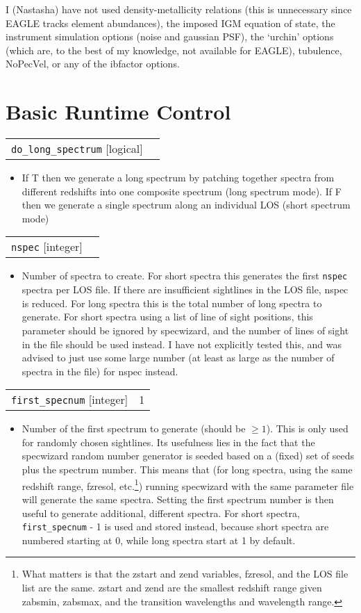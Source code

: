 \documentclass{report}
\makeatletter
\newcommand{\paramdefinition}[3]{
\begin{tabular*}{\textwidth}{l@{\extracolsep{\fill}}r}
		{\tt #1} [{\sc #2}]& #3 \\
\end{tabular*}}
\newcommand{\paramdescription}[1]{
\begin{itemize}
\item #1
\end{itemize}\vspace{0.2cm}}
\newcommand{\param}[1]{{\tt #1}}
\makeatother
\begin{document}
I (Nastasha) have not used density-metallicity relations (this is unnecessary since EAGLE tracks element abundances), the imposed IGM equation of state, the instrument simulation options (noise and gaussian PSF),  the `urchin' options (which are, to the best of my knowledge, not available for EAGLE), tubulence, NoPecVel, or any of the ibfactor options. 


\section{Basic Runtime Control}

\paramdefinition{do\_long\_spectrum}{logical}{}
\paramdescription{If T then we generate a long spectrum by patching together spectra from different redshifts into one composite spectrum (long spectrum mode).  If F then we generate a single spectrum along an individual LOS (short spectrum mode)}

\paramdefinition{nspec}{integer}{}
\paramdescription{Number of spectra to create.  For short spectra this generates the first {\tt nspec} spectra per LOS file. If there are insufficient sightlines in the LOS file, nspec is reduced. For long spectra this is the total number of long spectra to generate. For short spectra using a list of line of sight positions, this parameter should be ignored by specwizard, and the number of lines of sight in the file should be used instead. I have not explicitly tested this, and was advised to just use some large number (at least as large as the number of spectra in the file) for nspec instead.}

\paramdefinition{first\_specnum}{integer}{1}
\paramdescription{Number of the first spectrum to generate (should be $\geq 1$). This is only used for randomly chosen sightlines. Its usefulness lies in the fact that the specwizard random number generator is seeded based on a (fixed) set of seeds plus the spectrum number. This means that (for long spectra, using the same redshift range, fzresol, etc.\footnote{What matters is that the zstart and zend variables, fzresol, and the LOS file list are the same. zstart and zend are the smallest redshift range given zabsmin, zabsmax, and the transition wavelengths and wavelength range.}) running specwizard with the same parameter file will generate the same spectra. Setting the first spectrum number is then useful to generate additional, different spectra. For short spectra, \param{first\_specnum} - 1 is used and stored instead, because short spectra are numbered starting at 0, while long spectra start at 1 by default.}
\end{document}
